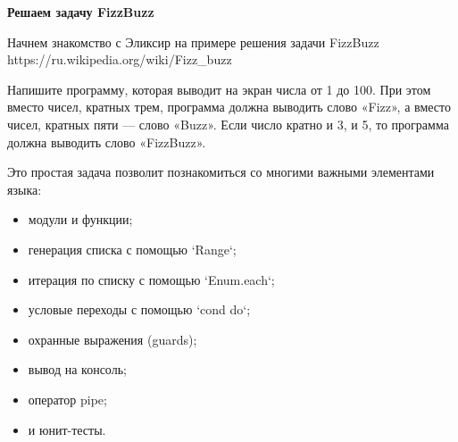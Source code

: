\textbf{Решаем задачу FizzBuzz}

Начнем знакомство с Эликсир на примере решения задачи  FizzBuzz  https://ru.wikipedia.org/wiki/Fizz\_buzz

Напишите программу, которая выводит на экран числа от 1 до 100. При этом вместо чисел, кратных трем, программа должна выводить слово «Fizz», а вместо чисел, кратных пяти — слово «Buzz». Если число кратно и 3, и 5, то программа должна выводить слово «FizzBuzz».

Это простая задача позволит познакомиться со многими важными элементами языка:
\begin{itemize}
\item модули и функции;
\item генерация списка с помощью `Range`;
\item итерация по списку с помощью `Enum.each`;
\item условые переходы с помощью `cond do`;
\item охранные выражения (guards);
\item вывод на консоль;
\item оператор pipe;
\item и юнит-тесты.
\end{itemize}
